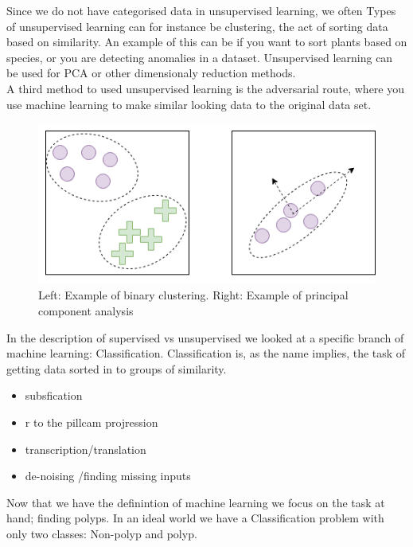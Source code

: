 \documentclass[a4paper,english]{ifimaster}
\begin{document}
	  Since we do not have categorised data in unsupervised learning, we often %
	  Types of unsupervised learning can for instance be clustering, the act of sorting data based on similarity. An example of this can be if you want to sort plants based on species, or 
	  you are detecting anomalies in a dataset.
	  Unsupervised learning can be used for PCA %
	  or other dimensionaly reduction methods.\\
	  
	  A third method to used unsupervised learning is the adversarial route, where you use machine learning to make similar looking data to the original data set. 
	    
	   \begin{figure}
	     \centering
	    \includegraphics[scale=0.5]{figures/cluster_pca.png}
	     \caption{Left: Example of binary clustering. Right: Example of principal component analysis} 
	  \end{figure}

	 
	  In the description of supervised vs unsupervised we looked at a specific branch of machine learning: Classification. Classification is, as the name implies, the task of 
	  getting data sorted in to groups of similarity. 
	  
	  
	  \begin{itemize}
	    \item subsfication
	    \item r to the pillcam projression 
	    \item transcription/translation
	    \item de-noising /finding missing inputs
	  \end{itemize}
	  
	  Now that we have the definintion of machine learning we focus on the task at hand; finding polyps. In an ideal world we have a
	  Classification problem with only two classes: Non-polyp and polyp. 
	  
\end{document}
